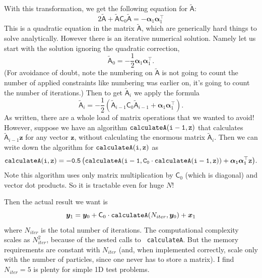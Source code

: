 \documentclass[11pt,a4paper,preprint]{aastex}
\newcommand{\bmath}[1]{\ensuremath{\bm{#1}}}
\renewcommand{\vec}[1]{\bmath{#1}}
\begin{document}
With this transformation, we get the following equation for $\tilde{\mathsf{A}}$:
\begin{equation}
2 \tilde{\mathsf{A}} + \tilde{\mathsf{A}} \mathsf{C}_0
\tilde{\mathsf{A}} = - \vec{\alpha}_1 \vec{\alpha}_1^{\top}  
\end{equation}
This is a quadratic equation in the matrix $\tilde{\mathsf{A}}$, which
are generically hard things to solve analytically. However there is an
iterative numerical solution. Namely let us start with the solution
ignoring the quadratic correction,
\begin{equation}
\tilde{\mathsf{A}}_0 = -\frac{1}{2} \vec{\alpha}_1 \vec{\alpha}_1^{\top}\textrm{.}
\end{equation}
(For avoidance of doubt, note the numbering on $\tilde{\mathsf{A}}$ is
not going to count the number of applied constraints like numbering
was earlier on, it's going to count the number of iterations.) Then to
get $\tilde{\mathsf{A}}_{i}$ we apply the formula
\begin{equation}
\tilde{\mathsf{A}}_{i} = -\frac{1}{2} \left(\tilde{\mathsf{A}}_{i-1}
  \mathsf{C}_0 \tilde{\mathsf{A}}_{i-1} + \vec{\alpha}_1 \vec{\alpha}_1^{\top} \right)\textrm{.}
\end{equation}
As written, there are a whole load of matrix operations that we wanted
to avoid! However, suppose we have an algorithm ${\tt calculateA(i-1,z)}$
that calculates $\tilde{\mathsf{A}}_{i-1} \vec{z}$ for any vector
$\vec{z}$, without calculating the enormous matrix
$\tilde{\mathsf{A}}_i$. Then we can write down the algorithm for ${\tt
  calculateA(i,z)}$ as
\begin{equation}
{\tt calculateA(i,z) = -0.5 \left(calculateA(i-1, C_0 \cdot calculateA(i-1,
  z)) + \vec{\alpha}_1 \vec{\alpha}_1^{\top} \vec{z} \right)}\textrm{.}
\end{equation}
Note this algorithm uses only matrix multiplication by $\mathsf{C}_0$
(which is diagonal) and vector dot products. So it is tractable even
for huge $N$! 

Then the actual result we want is
\begin{equation}
\vec{y}_1 = \vec{y}_0 + \mathsf{C}_0 \cdot {\tt
  calculateA}(N_{iter},\vec{y}_0) + \vec{x}_1
\end{equation}
where $N_{iter}$ is the total number of iterations. The computational
complexity scales as $N_{iter}^2$, because of the nested calls to {\tt
  calculateA}. But the memory requirements are constant with
$N_{iter}$ (and, when implemented correctly, scale only with the
number of particles, since one never has to store a matrix). I find
$N_{iter}=5$ is plenty for simple 1D test problems.
\end{document}
